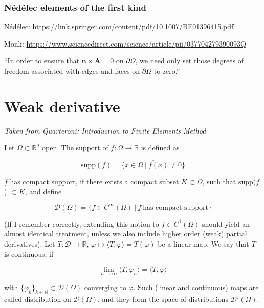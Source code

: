 \documentclass[11pt, a4paper]{article}
\begin{document}
\subsubsection{Nédélec elements of the first kind}
\label{subsubsec:label}

Nédélec: \url{https://link.springer.com/content/pdf/10.1007/BF01396415.pdf}

Monk: \url{https://www.sciencedirect.com/science/article/pii/037704279390093Q}

\enquote{In order to ensure that $\mathbf{n} \times \mathbf{A} = 0$ on $\partial \Omega$,
we need only set those degrees of freedom associated with edges and faces on $\partial \Omega$
to zero.}


\section{Weak derivative}
\label{sec:weak}

\textit{Taken from Quarteroni: Introduction to Finite Elements Method}

Let $\Omega \subset \mathbb{R}^d$ open. The support of $f:\Omega \to \mathbb{R}$
is defined as

\begin{equation}
    \text{supp}(f) = \overline{\{x \in \Omega ~|~ f(x) \neq 0\}}
\end{equation}

$f$ has compact support, if there exists a compact subset $K \subset \Omega$,
such that supp($f$) $\subset K$, and define

\begin{equation}
    \mathcal{D}(\Omega) = \{f \in C^{\infty}(\Omega) ~|~ f ~\text{has compact support}\}
\end{equation}

(If I remember correctly, extending this notion to $f \in C^1(\Omega)$ should yield
an almost identical treatment, unless we also include higher order (weak) partial derivatives).
Let $T: \mathcal{D} \to \mathbb{R}$, $\varphi \mapsto \langle T, \varphi \rangle = T(\varphi)$
be a linear map. We say that $T$ is continuous, if

\begin{equation}
    \lim_{n\to\infty} \langle T, \varphi_n \rangle = \langle T, \varphi \rangle
\end{equation}

with $\{\varphi_k\}_{k \in \mathbb{N}} \subset \mathcal{D}(\Omega)$ converging to $\varphi$.
Such (linear and continuous) maps are called distribution on $\mathcal{D}(\Omega)$,
and they form the space of distributions $\mathcal{D}'(\Omega)$.
\end{document}
